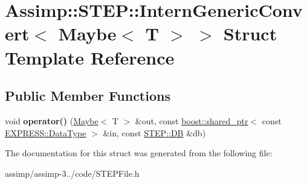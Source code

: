 \hypertarget{struct_assimp_1_1_s_t_e_p_1_1_intern_generic_convert_3_01_maybe_3_01_t_01_4_01_4}{\section{Assimp\+:\+:S\+T\+E\+P\+:\+:Intern\+Generic\+Convert$<$ Maybe$<$ T $>$ $>$ Struct Template Reference}
\label{struct_assimp_1_1_s_t_e_p_1_1_intern_generic_convert_3_01_maybe_3_01_t_01_4_01_4}
}
\subsection*{Public Member Functions}
\begin{DoxyCompactItemize}
\item 
\hypertarget{struct_assimp_1_1_s_t_e_p_1_1_intern_generic_convert_3_01_maybe_3_01_t_01_4_01_4_a91e327dbc0c68060a9a20287a7c514a5}{void {\bfseries operator()} (\hyperlink{struct_assimp_1_1_s_t_e_p_1_1_maybe}{Maybe}$<$ T $>$ \&out, const \hyperlink{classboost_1_1shared__ptr}{boost\+::shared\+\_\+ptr}$<$ const \hyperlink{class_assimp_1_1_s_t_e_p_1_1_e_x_p_r_e_s_s_1_1_data_type}{E\+X\+P\+R\+E\+S\+S\+::\+Data\+Type} $>$ \&in, const \hyperlink{class_assimp_1_1_s_t_e_p_1_1_d_b}{S\+T\+E\+P\+::\+D\+B} \&db)}\label{struct_assimp_1_1_s_t_e_p_1_1_intern_generic_convert_3_01_maybe_3_01_t_01_4_01_4_a91e327dbc0c68060a9a20287a7c514a5}

\end{DoxyCompactItemize}


The documentation for this struct was generated from the following file\+:\begin{DoxyCompactItemize}
\item 
assimp/assimp-\/3../code/S\+T\+E\+P\+File.\+h\end{DoxyCompactItemize}
